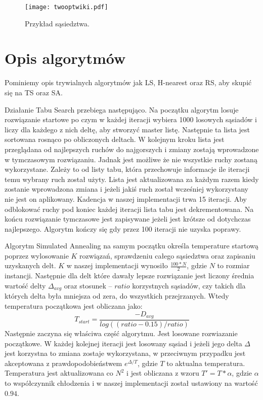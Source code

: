 \documentclass{article}
\begin{document}
\begin{figure} 
\begin{center}
\texttt{[image: twooptwiki.pdf]}
\end{center}
\caption{Przykład sąsiedztwa.}
\label{fig:schemat2}
\end{figure}


\section{Opis algorytmów}

Pominiemy opis trywialnych algorytmów jak LS, H-nearest oraz RS, aby skupić się na TS oraz SA.

Działanie Tabu Search przebiega następująco. Na początku algorytm losuje rozwiązanie startowe po czym w każdej iteracji wybiera 1000 losowych sąsiadów i liczy dla każdego z nich deltę, aby stworzyć master listę. Następnie ta lista jest sortowana rosnąco po obliczonych deltach. W kolejnym kroku lista jest przeglądana od najlepszych ruchów do najgorszych i zmiany zostają wprowadzone w tymczasowym rozwiązaniu. Jadnak jest możliwe że nie wszystkie ruchy zostaną wykorzystane. Zależy to od listy tabu, która przechowuje informacje ile iteracji temu wybrany ruch został użyty. Lista jest aktualizowana za każdym razem kiedy zostanie wprowadzona zmiana i jeżeli jakiś ruch został wcześniej wykorzystany nie jest on aplikowany. Kadencja w naszej implementacji trwa 15 iteracji. Aby odblokować ruchy pod koniec każdej iteracji lista tabu jest dekrementowana. Na końcu rozwiązanie tymczasowe jest zapisywane jeżeli jest krótsze od dotychczas najlepszego. Algorytm kończy się gdy przez 100 iteracji nie uzyska poprawy.


Algorytm Simulated Annealing na samym początku określa temperature startową poprzez wylosowanie $K$ rozwiązań, sprawdzeniu całego sąsiedztwa oraz zapisaniu uzyskanych delt. $K$ w naszej implementacji wynosiło $\frac{100 * N}{2}$, gdzie $N$ to rozmiar instancji. Następnie dla delt które dawały lepsze rozwiązanie jest liczony średnia wartość delty $\Delta_{avg}$ oraz stosunek -- $ratio$ korzystnych sąsiadów, czy takich dla których delta była mniejsza od zera, do wszystkich przejrzanych. Wtedy temperatura początkowa jest obliczana jako:
$$
T_{start} = \frac{-D_{avg}}{log((ratio - 0.15) / ratio)}
$$
Następnie zaczyna się właściwa część algorytmu. Jest losowane rozwiazanie początkowe. W każdej kolejnej iteracji jest losowany sąsiad i jeżeli jego delta $\Delta$ jest korzystna to zmiana zostaje wykorzystana, w przeciwnym przypadku jest akceptowana z prawdopodobieństwem $e^{\Delta/T}$, gdzie $T$ to aktualna temperatura. Temperatura jest aktualizowana co $N^2$ i jest obliczana z wzoru $T'=T*\alpha$, gdzie $\alpha$ to współczynnik chłodzenia i w naszej implementacji został ustawiony na wartość $0.94$.
\end{document}
